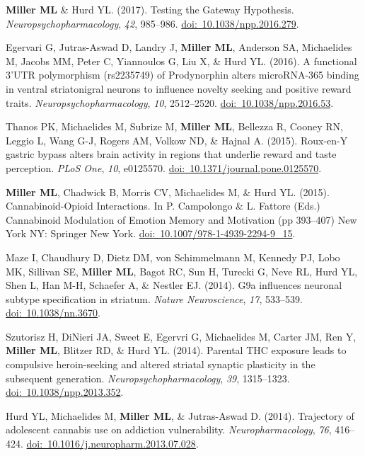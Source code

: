 \documentclass[10pt]{article}
\begin{document}
\begin{description}
\item \textbf{Miller ML} \& Hurd YL. (2017). Testing the Gateway Hypothesis. \textit{Neuropsychopharmacology}, \textit{42}, 985--986. \href{https://doi.org/10.1038/npp.2016.279}{doi:~10.1038/npp.2016.279}.
\item Egervari G, Jutras-Aswad D, Landry J, \textbf{Miller ML}, Anderson SA, Michaelides M, Jacobs MM, Peter C, Yiannoulos G, Liu X, \& Hurd YL. (2016). A functional 3’UTR polymorphism (rs2235749) of Prodynorphin alters microRNA-365 binding in ventral striatonigral neurons to influence novelty seeking and positive reward traits. \textit{Neuropsychopharmacology}, \textit{10}, 2512--2520. \href{https://doi.org/10.1038/npp.2016.53}{doi:~10.1038/npp.2016.53}.
\item Thanos PK, Michaelides M, Subrize M, \textbf{Miller ML}, Bellezza R, Cooney RN, Leggio L, Wang G-J, Rogers AM, Volkow ND, \& Hajnal A. (2015). Roux-en-Y gastric bypass alters brain activity in regions that underlie reward and taste perception. \textit{PLoS One}, \textit{10}, e0125570. \href{https://doi.org/10.1371/journal.pone.0125570}{doi:~10.1371/journal.pone.0125570}.
\item \textbf{Miller ML}, Chadwick B, Morris CV, Michaelides M, \& Hurd YL. (2015). Cannabinoid-Opioid Interactions. In P. Campolongo \& L. Fattore (Eds.) Cannabinoid Modulation of Emotion Memory and Motivation (pp 393--407) New York NY: Springer New York. \href{https://doi.org/10.1007/978-1-4939-2294-9_15}{doi:~10.1007/978-1-4939-2294-9\_15}.
\item Maze I, Chaudhury D, Dietz DM, von Schimmelmann M, Kennedy PJ, Lobo MK, Sillivan SE, \textbf{Miller ML}, Bagot RC, Sun H, Turecki G, Neve RL, Hurd YL, Shen L, Han M-H, Schaefer A, \& Nestler EJ. (2014). G9a influences neuronal subtype specification in striatum. \textit{Nature Neuroscience}, \textit{17}, 533--539. \href{https://doi.org/10.1038/nn.3670}{doi:~10.1038/nn.3670}.
\item Szutorisz H, DiNieri JA, Sweet E, Egervri G, Michaelides M, Carter JM, Ren Y, \textbf{Miller ML}, Blitzer RD, \& Hurd YL. (2014). Parental THC exposure leads to compulsive heroin-seeking and altered striatal synaptic plasticity in the subsequent generation. \textit{Neuropsychopharmacology}, \textit{39}, 1315--1323. \href{https://doi.org/10.1038/npp.2013.352}{doi:~10.1038/npp.2013.352}.
\item Hurd YL, Michaelides M, \textbf{Miller ML}, \& Jutras-Aswad D. (2014). Trajectory of adolescent cannabis use on addiction vulnerability. \textit{Neuropharmacology}, \textit{76}, 416--424. \href{https://doi.org/10.1016/j.neuropharm.2013.07.028}{doi:~10.1016/j.neuropharm.2013.07.028}.

\end{description}
\end{document}
